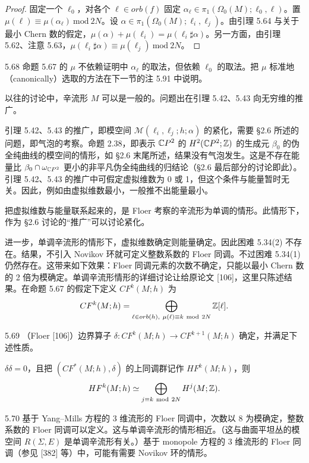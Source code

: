 \begin{proof}
  固定一个 $\ell_0$，对各个 $\ell\in orb(f)$ 固定 $\alpha_\ell\in\pi_1(\Omega_0(M);\ell_0,\ell)$。置 $\mu(\ell)\equiv\mu(\alpha_\ell)\ \mathrm{mod}\ 2N$。设 $\alpha\in\pi_1(\Omega_0(M);\ell_i,\ell_j)$。由引理 5.64 与关于最小 Chern 数的假定，$\mu(\alpha)+\mu(\ell_i)=\mu(\ell_i\sharp\alpha)$。另一方面，由引理 5.62、注意 5.63，$\mu(\ell_i\sharp\alpha)\equiv\mu(\ell_j)\ \mathrm{mod}\ 2N$。
\end{proof}

\begin{remark}{5.68}
  命题 5.67 的 $\mu$ 不依赖证明中 $\alpha_\ell$ 的取法，但依赖 $\ell_0$ 的取法。把 $\mu$ 标准地（canonically）选取的方法在下一节的注 5.91 中说明。
\end{remark}

以往的讨论中，辛流形 $M$ 可以是一般的。问题出在引理 5.42、5.43 向无穷维的推广。

引理 5.42、5.43 的推广，即模空间 $\mathcal{M}(\ell_i,\ell_j;h;\alpha)$ 的紧化，需要 §2.6 所述的问题，即气泡的考察。命题 2.38，即表示 $\mathbb{C}P^2$ 的 $H^2(\mathbb{C}P^2;\mathbb{Z})$ 的生成元 $\beta_0$ 的伪全纯曲线的模空间的情形，如 §2.6 末尾所述，结果没有气泡发生。这是不存在能量比 $\beta_0\cap\omega_{\mathbb{C}P^2}$ 更小的非平凡伪全纯曲线的归结论（§2.6 最后部分的讨论即此）。引理 5.42、5.43 的推广中可假定虚拟维数为 0 或 1，但这个条件与能量暂时无关。因此，例如由虚拟维数最小，一般推不出能量最小。

把虚拟维数与能量联系起来的，是 Floer 考察的辛流形为单调的情形。此情形下，作为 §2.6 讨论的“推广”可以讨论紧化。

进一步，单调辛流形的情形下，虚拟维数确定则能量确定。因此困难 5.34(2) 不存在。结果，不引入 Novikov 环就可定义整数系数的 Floer 同调。不过困难 5.34(1) 仍然存在。这带来如下效果：Floer 同调元素的次数不确定，只能以最小 Chern 数的 2 倍为模确定。单调辛流形情形的详细讨论让给原论文 [106]，这里只陈述结果。在命题 5.67 的假定下定义 $CF^k(M;h)$ 为
\[
  CF^k(M;h)=\bigoplus_{\ell\in orb(h),\ \mu(\ell)\equiv k\ \mathrm{mod}\ 2N}\Z[\ell].
\]

\begin{theorem}{5.69}
  （Floer [106]）边界算子 $\delta\colon CF^k(M;h)\to CF^{k+1}(M;h)$ 确定，并满足下述性质。

  $\delta\delta=0$，且把 $(CF^*(M;h),\delta)$ 的上同调群记作 $HF^k(M;h)$，则
  \[
    HF^k(M;h)\simeq\bigoplus_{j\equiv k\ \mathrm{mod}\ 2N}H^j(M;\Z).
  \]
\end{theorem}

\begin{remark}{5.70}
  基于 Yang–Mills 方程的 3 维流形的 Floer 同调中，次数以 8 为模确定，整数系数的 Floer 同调可以定义。这与单调辛流形的情形相近。（这与曲面平坦丛的模空间 $R(\Sigma,E)$ 是单调辛流形有关。）基于 monopole 方程的 3 维流形的 Floer 同调（参见 [382] 等）中，可能有需要 Novikov 环的情形。
\end{remark}

